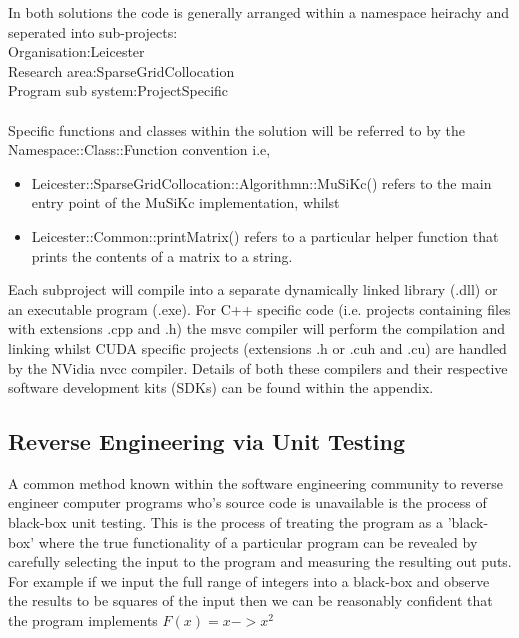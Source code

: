 \documentclass[a4paper]{amsart}
\begin{document}
In both solutions the code is generally arranged within a namespace heirachy and seperated into sub-projects:\\
		Organisation:\quad \quad \quad \quad \quad \quad Leicester\\
		Research area:\quad \quad \quad \quad \quad \quad \quad \quad SparseGridCollocation\\
		Program sub system:\quad \quad \quad\quad \quad \quad \quad \quad\quad \quad ProjectSpecific\\
\\Specific functions and classes within the solution will be referred to by the Namespace::Class::Function convention i.e,\\
\begin{itemize}
\item Leicester::SparseGridCollocation::Algorithmn::MuSiKc() refers to the main entry point of the MuSiKc implementation, whilst 
\item Leicester::Common::printMatrix() refers to a particular helper function that prints the contents of a matrix to a string.
\end{itemize}

Each subproject will compile into a separate dynamically linked library (.dll) or an executable program (.exe). For C++ specific code (i.e. projects containing files with extensions .cpp and .h) the msvc compiler will perform the compilation and linking whilst CUDA specific projects (extensions .h or .cuh and .cu) are handled by the NVidia nvcc compiler. Details of both these compilers and their respective software development kits (SDKs) can be found within the appendix.\\

\subsection{Reverse Engineering via Unit Testing}
A common method known within the software engineering community to reverse engineer computer programs who's source code is unavailable is the process of black-box unit testing\cite{comp1}. This is the process of treating the program as a 'black-box' where the true functionality of a particular program can be revealed by carefully selecting the input to the program and measuring the resulting out puts.\\ 

For example if we input the full range of integers into a black-box and observe the results to be squares of the input then we can be reasonably confident that the program implements $F(x) = x -> x^{2}$\\
\end{document}

